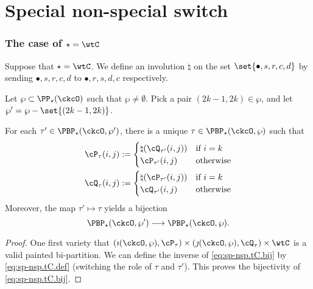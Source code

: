 \documentclass[unipcounting]{subfiles}
\begin{document}
\def\PBPs{\PBP_\star}

\section{Special non-special switch}

\subsubsection{The case of $\star=\wtC$}
Suppose that $\star=\wtC$.
\def\dsrcd{\set{\bullet,s,r,c,d}}
We define an involution $\natural$ on the set $\dsrcd$  by 
sending $\bullet,s,r,c,d$ to $\bullet, r,s,d,c$ respectively. 

Let $\wp\subset \PP_\star(\ckcO)$ such that $\wp\neq \emptyset$. 
Pick a pair $(2k-1,2k)\in \wp$, and let $\wp' = \wp - \set{(2k-1,2k)}$.
\begin{lem}\label{lem:sp-nsp.C}
For each $\tau'\in \PBPs(\ckcO,\wp')$, there is a unique $\tau\in\PBPs(\ckcO,\wp)$
such that 
\begin{equation}\label{eq:sp-nsp.tC.def}
\begin{split}
 \cP_\tau(i,j) & := \begin{cases}
    \natural(\cQ_{\tau'}(i,j) ) & \text{if } i = k \\
    \cP_{\tau'}(i,j) & \text{otherwise} 
 \end{cases} \\ %
 \cQ_\tau(i,j)&  := \begin{cases}
    \natural(\cP_{\tau'}(i,j) ) & \text{if } i = k \\
    \cQ_{\tau'}(i,j) & \text{otherwise} 
 \end{cases}
 \end{split}
\end{equation}
Moreover, the map $\tau'\mapsto \tau$ yields a bijection
\begin{equation}\label{eq:sp-nsp.tC.bij}
    \PBP_\star(\ckcO,\wp') \longrightarrow \PBPs(\ckcO,\wp). 
\end{equation}
\end{lem}
\begin{proof}
One first variety that $(\imath(\ckcO,\wp), \cP_\tau)
\times (\jmath(\ckcO,\wp),\cQ_\tau)\times \wtC$ is a valid painted bi-partition. 
We can define the inverse of \eqref{eq:sp-nsp.tC.bij} by \eqref{eq:sp-nsp.tC.def} (switching the role of $\tau$ and $\tau'$). 
This proves the bijectivity of \eqref{eq:sp-nsp.tC.bij}. 
\end{proof}
\end{document}
